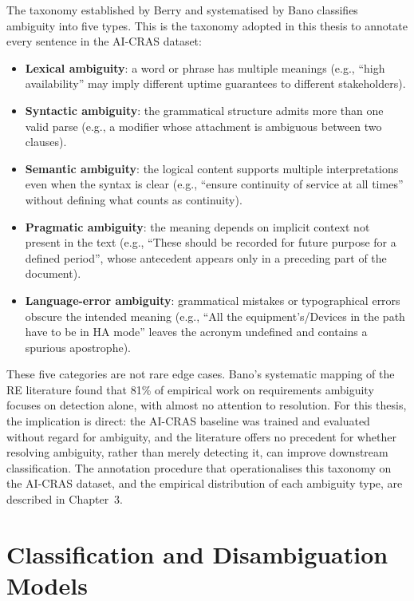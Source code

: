The taxonomy established by Berry and systematised by Bano \cite{bano2015ambiguity} classifies ambiguity into five types. This is the taxonomy adopted in this thesis to annotate every sentence in the AI-CRAS dataset:

\begin{itemize}
    \item \textbf{Lexical ambiguity}: a word or phrase has multiple meanings (e.g., ``high availability'' may imply different uptime guarantees to different stakeholders).
    \item \textbf{Syntactic ambiguity}: the grammatical structure admits more than one valid parse (e.g., a modifier whose attachment is ambiguous between two clauses).
    \item \textbf{Semantic ambiguity}: the logical content supports multiple interpretations even when the syntax is clear (e.g., ``ensure continuity of service at all times'' without defining what counts as continuity).
    \item \textbf{Pragmatic ambiguity}: the meaning depends on implicit context not present in the text (e.g., ``These should be recorded for future purpose for a defined period'', whose antecedent appears only in a preceding part of the document).
    \item \textbf{Language-error ambiguity}: grammatical mistakes or typographical errors obscure the intended meaning (e.g., ``All the equipment's/Devices in the path have to be in HA mode'' leaves the acronym undefined and contains a spurious apostrophe).
\end{itemize}

These five categories are not rare edge cases. Bano's systematic mapping of the RE literature found that 81\% of empirical work on requirements ambiguity focuses on detection alone, with almost no attention to resolution. For this thesis, the implication is direct: the AI-CRAS baseline was trained and evaluated without regard for ambiguity, and the literature offers no precedent for whether resolving ambiguity, rather than merely detecting it, can improve downstream classification. The annotation procedure that operationalises this taxonomy on the AI-CRAS dataset, and the empirical distribution of each ambiguity type, are described in Chapter~3.

\section{Classification and Disambiguation Models}

